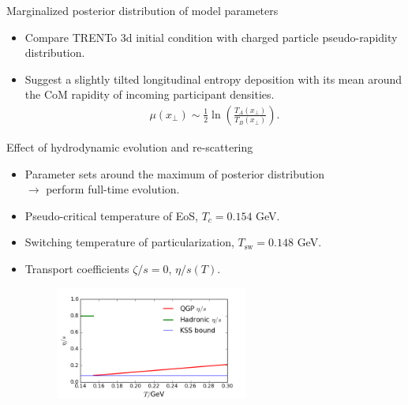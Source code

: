 \documentclass[11pt]{beamer}
\begin{document}
\begin{frame}{Marginalized posterior distribution of model parameters}
\begin{itemize}
\item Compare TRENTo 3d initial condition with charged particle pseudo-rapidity distribution.
\item Suggest a slightly tilted longitudinal entropy deposition with its mean around the CoM rapidity of incoming participant densities.
\begin{eqnarray}
\mu(x_\perp) \sim \frac{1}{2}\ln\left(\frac{T_A(x_\perp)}{T_B(x_\perp)}\right).
\end{eqnarray}
\end{itemize}
\end{frame}

\begin{frame}{Effect of hydrodynamic evolution and re-scattering}
\begin{itemize}
\item Parameter sets around the maximum of posterior distribution \\ $\rightarrow$ perform full-time evolution.
\item Pseudo-critical temperature of EoS, $T_c = 0.154$ GeV.
\item Switching temperature of particularization, $T_{\textrm{sw}} = 0.148$ GeV.
\item Transport coefficients $\zeta/s = 0$, $\eta/s(T)$.
\begin{center}
\begin{figure}
\includegraphics[width=0.6\textwidth]{./pics/trans_coeff.png}
\end{figure}
\end{center}
\end{itemize}
\end{frame}
\end{document}
